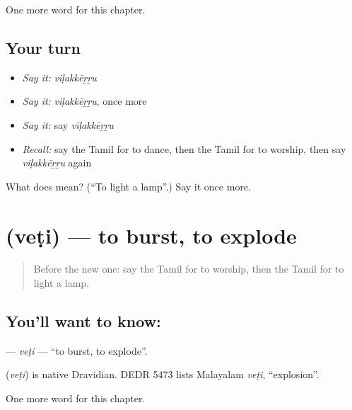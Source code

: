 \begin{grammarlens}[title={What you've built}]
One more word for this chapter.
\end{grammarlens}

\subsection*{Your turn}
\begin{itemize}
\raggedright
  \item \emph{Say it:} \emph{viḷakkēṟṟu}
  \item \emph{Say it:} \emph{viḷakkēṟṟu}, once more
  \item \emph{Say it:} say \emph{viḷakkēṟṟu}
  \item \emph{Recall:} say the Tamil for to dance, then the Tamil for to worship, then say \emph{viḷakkēṟṟu} again
\end{itemize}

\begin{tcolorbox}[breakable,colback=teal!4,colframe=teal!35!black,title={Before you move on}]
What does  mean? (\textquotedblleft{}To light a lamp\textquotedblright{}.) Say it once more.
\end{tcolorbox}
\section[\texorpdfstring{\ta{வெடி} (veṭi)}{வெடி (veṭi)}]{ (veṭi) — to burst, to explode}

\label{lesson:TA-C166-veti}



\begin{quote}
Before the new one: say the Tamil for to worship, then the Tamil for to light a lamp.
\end{quote}

\subsection*{You'll want to know: }
\textbf{} — \emph{veṭi} — \textquotedblleft{}to burst, to explode\textquotedblright{}.

\begin{cousinweb}
\textbf{} (\emph{veṭi}) is native Dravidian. DEDR 5473 lists Malayalam \emph{veṭi}, \textquotedblleft{}explosion\textquotedblright{}.
\end{cousinweb}

\begin{grammarlens}[title={What you've built}]
One more word for this chapter.
\end{grammarlens}

